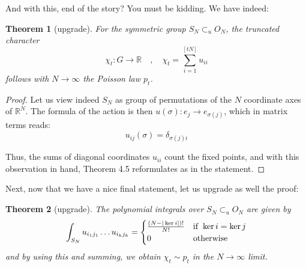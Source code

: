 \documentclass[12pt]{amsbook}
\newtheorem{theorem}{Theorem}[chapter]
\begin{document}
And with this, end of the story? You must be kidding. We have indeed:


\begin{theorem}[upgrade]
For the symmetric group $S_N\subset_uO_N$, the truncated character
$$\chi_t:G\to\mathbb R\quad,\quad 
\chi_t=\sum_{i=1}^{[tN]}u_{ii}$$
follows with $N\to\infty$ the Poisson law $p_t$.
\end{theorem}

\begin{proof}
Let us view indeed $S_N$ as group of permutations of the $N$ coordinate axes of $\mathbb R^N$. The formula of the action is then $u(\sigma):e_j\to e_{\sigma(j)}$, which in matrix terms reads:
$$u_{ij}(\sigma)=\delta_{\sigma(j)i}$$

Thus, the sums of diagonal coordinates $u_{ii}$ count the fixed points, and with this observation in hand, Theorem 4.5 reformulates as in the statement.
\end{proof}

Next, now that we have a nice final statement, let us upgrade as well the proof:


\begin{theorem}[upgrade]
The polynomial integrals over $S_N\subset_uO_N$ are given by
$$\int_{S_N}u_{i_1j_1}\ldots u_{i_kj_k}=\begin{cases}
\frac{(N-|\ker i|)!}{N!}&{\rm if}\ \ker i=\ker j\\
0&{\rm otherwise}
\end{cases}$$
and by using this and summing, we obtain $\chi_t\sim p_t$ in the $N\to\infty$ limit.
\end{theorem}
\end{document}
